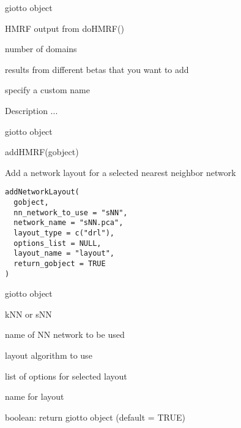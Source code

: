 \documentclass[a4paper]{book}
\begin{document}
%
\begin{Arguments}
\begin{ldescription}
\item[\code{gobject}] giotto object

\item[\code{HMRFoutput}] HMRF output from doHMRF()

\item[\code{k}] number of domains

\item[\code{betas\_to\_add}] results from different betas that you want to add

\item[\code{name}] specify a custom name
\end{ldescription}
\end{Arguments}
%
\begin{Details}\relax
Description ...
\end{Details}
%
\begin{Value}
giotto object
\end{Value}
%
\begin{Examples}
\begin{ExampleCode}
    addHMRF(gobject)
\end{ExampleCode}
\end{Examples}
%
\begin{Description}\relax
Add a network layout for a selected nearest neighbor network
\end{Description}
%
\begin{Usage}
\begin{verbatim}
addNetworkLayout(
  gobject,
  nn_network_to_use = "sNN",
  network_name = "sNN.pca",
  layout_type = c("drl"),
  options_list = NULL,
  layout_name = "layout",
  return_gobject = TRUE
)
\end{verbatim}
\end{Usage}
%
\begin{Arguments}
\begin{ldescription}
\item[\code{gobject}] giotto object

\item[\code{nn\_network\_to\_use}] kNN or sNN

\item[\code{network\_name}] name of NN network to be used

\item[\code{layout\_type}] layout algorithm to use

\item[\code{options\_list}] list of options for selected layout

\item[\code{layout\_name}] name for layout

\item[\code{return\_gobject}] boolean: return giotto object (default = TRUE)
\end{ldescription}
\end{Arguments}
\end{document}
